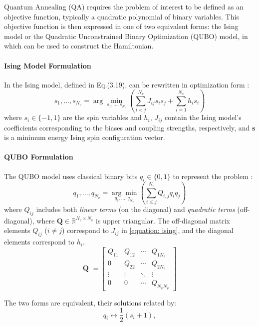 Quantum Annealing (QA) requires the problem of interest to be defined as an objective function, typically a quadratic polynomial of binary variables. This objective function is then expressed in one of two equivalent forms: the Ising model or the Quadratic Unconstrained Binary Optimization (QUBO) model, in which can be used to construct the Hamiltonian.

\paragraph{Ising Model Formulation}
In the Ising model, defined in Eq.(3.19), can be rewritten in optimization form \cite{QAKadowaki1998QuantumAI}:
\begin{equation}
s_1, \dots, s_{N_v} = \arg \min_{s_1, \dots, s_{N_v}} \left( \sum_{i<j}^{N_v} J_{ij}s_i s_j + \sum_{i=1}^{N_v} h_i s_i \right) \label{equation: ising}
\end{equation}
where $s_i \in \{-1, 1\}$ are the spin variables and $h_i$, $J_{ij}$ contain the Ising model's coefficients corresponding to the biases and coupling strengths, respectively, and \textit{$\mathbf{s}$} is a minimum energy Ising spin configuration vector.

\paragraph{QUBO Formulation}
The QUBO model uses classical binary bits \(q_i \in \{0, 1\}\) to represent the problem \cite{Tanaka2017QuantumSG}:
\begin{equation}
q_1, \dots, q_{N_v} = \underset{q_1, \dots, q_{N_v}}{\arg \min} \left( \sum_{i \leq j}^{N_v} Q_{i,j}q_i q_j \right) 
\end{equation}
where \(Q_{ij}\) includes both \textit{linear terms} (on the diagonal) and \textit{quadratic terms} (off-diagonal), where $\textbf{Q} \in \mathbb{R}^{N_v \times N_v}$ is upper triangular. The off-diagonal matrix elements $Q_{ij}$ ($i \neq j$) correspond to $J_{ij}$ in \autoref{equation: ising}, and the diagonal elements correspond to $h_i$.
\[
\textbf{Q }= \begin{bmatrix}
Q_{11} & Q_{12} & \cdots & Q_{1N_v} \\
0 & Q_{22} & \cdots & Q_{2N_v} \\
\vdots & \vdots & \ddots & \vdots \\
0 & 0 & \cdots & Q_{N_v N_v} \tag{3.13b}
\end{bmatrix}
\]

The two forms are equivalent, their solutions related by:
\begin{equation}
q_i \leftrightarrow \frac{1}{2}(s_i + 1), 
\end{equation}

